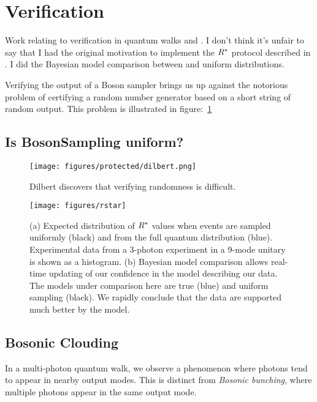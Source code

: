 \section{Verification}
Work relating to verification in quantum walks and \bosonsampling{}. I don't
think it's unfair to say that I had the original motivation to implement the
\(\rstar\) protocol described in \cite{notuniform}. I did the Bayesian model
comparison between \bosonsampling{} and uniform distributions.

Verifying the output of a Boson sampler brings us up against the notorious
problem of certifying a random number generator based on a short string of
random output. This problem is illustrated in figure:~\ref{fig:dilbert}

\subsection{Is BosonSampling uniform?}
\label{sec:Verification}
\begin{figure}
  \centering
  \texttt{[image: figures/protected/dilbert.png]}
  \caption[Dilbert discovers that verifying randomness is difficult.]
  {Dilbert discovers that verifying randomness is difficult.}
  \label{fig:dilbert}
\end{figure}

\begin{figure}
  \centering
  \texttt{[image: figures/rstar]}
  \caption[Using the $\rstar$ discriminator to verify BosonSampling]
  {(a) Expected distribution of \(\rstar\) values when events are sampled
  uniformly (black) and from the full quantum distribution (blue). Experimental
  data from a 3-photon experiment in a 9-mode unitary is shown as a histogram.
  (b) Bayesian model comparison allows real-time updating of our confidence in
  the model describing our data. The models under comparison here are true
  \bosonsampling{} (blue) and uniform sampling (black). We rapidly conclude that
  the data are supported much better by the \bosonsampling{} model.}
\end{figure}

\subsection{Bosonic Clouding}
In a multi-photon quantum walk, we observe a phenomenon where photons tend to
appear in nearby output modes. This is distinct from \emph{Bosonic bunching},
where multiple photons appear in the same output mode.

